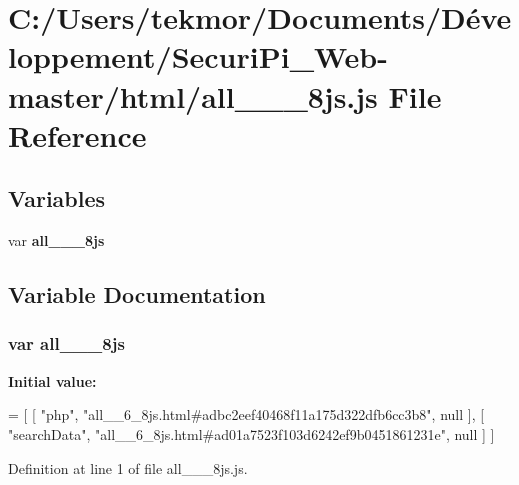 \section{C\+:/\+Users/tekmor/\+Documents/\+Développement/\+Securi\+Pi\+\_\+\+Web-\/master/html/all\+\_\+\+\_\+\_\+8js.js File Reference}
\label{all____6__8js_8js}
\subsection*{Variables}
\begin{DoxyCompactItemize}
\item 
var {\bf all\+\_\+\+\_\+\_\+8js}
\end{DoxyCompactItemize}


\subsection{Variable Documentation}
\subsubsection[{all\+\_\+\+\_\+6\+\_\+8js}]{\setlength{\rightskip}{0pt plus 5cm}var all\+\_\+\+\_\+\_\+8js}\label{all____6__8js_8js_a8679bc082c2381b23afeeed73975e0c5}
{\bfseries Initial value\+:}
\begin{DoxyCode}
=
[
    [ \textcolor{stringliteral}{"php"}, \textcolor{stringliteral}{"all\_\_6\_8js.html#adbc2eef40468f11a175d322dfb6cc3b8"}, null ],
    [ \textcolor{stringliteral}{"searchData"}, \textcolor{stringliteral}{"all\_\_6\_8js.html#ad01a7523f103d6242ef9b0451861231e"}, null ]
]
\end{DoxyCode}


Definition at line 1 of file all\+\_\+\+\_\+\_\+8js.\+js.

